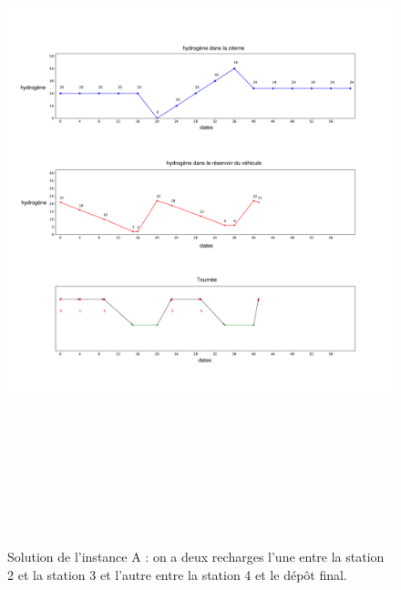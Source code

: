 	\begin{figure}[H]
	\centerline{
		\includegraphics[height=20cm]{images_these/DPS_sol_0.pdf}}
	\caption[La solution de l'instance A]{Solution de l'instance A : on a deux recharges l'une entre la station 2 et la station 3 et l'autre entre la station 4 et le dépôt final.}
	\label{S_Inst_0}
\end{figure}
